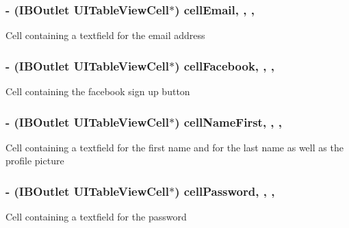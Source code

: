 \subsubsection[{cell\+Email}]{\setlength{\rightskip}{0pt plus 5cm}-\/ (I\+B\+Outlet U\+I\+Table\+View\+Cell$\ast$) cell\+Email\hspace{0.3cm}{\ttfamily [read]}, {\ttfamily [write]}, {\ttfamily [nonatomic]}, {\ttfamily [strong]}}\label{category_e_s_register_view_07_08_ac66f6acb48873fb10a77c519fca9c2d3}
Cell containing a textfield for the email address \hypertarget{category_e_s_register_view_07_08_a4a74d3606bea95c401ecbaba1b12e4b9}{}
\subsubsection[{cell\+Facebook}]{\setlength{\rightskip}{0pt plus 5cm}-\/ (I\+B\+Outlet U\+I\+Table\+View\+Cell$\ast$) cell\+Facebook\hspace{0.3cm}{\ttfamily [read]}, {\ttfamily [write]}, {\ttfamily [nonatomic]}, {\ttfamily [strong]}}\label{category_e_s_register_view_07_08_a4a74d3606bea95c401ecbaba1b12e4b9}
Cell containing the facebook sign up button \hypertarget{category_e_s_register_view_07_08_a5382959659179f1ea52c4ad5773eb7b1}{}
\subsubsection[{cell\+Name\+First}]{\setlength{\rightskip}{0pt plus 5cm}-\/ (I\+B\+Outlet U\+I\+Table\+View\+Cell$\ast$) cell\+Name\+First\hspace{0.3cm}{\ttfamily [read]}, {\ttfamily [write]}, {\ttfamily [nonatomic]}, {\ttfamily [strong]}}\label{category_e_s_register_view_07_08_a5382959659179f1ea52c4ad5773eb7b1}
Cell containing a textfield for the first name and for the last name as well as the profile picture \hypertarget{category_e_s_register_view_07_08_a8a036d69184622c124502ec3ad0b932b}{}
\subsubsection[{cell\+Password}]{\setlength{\rightskip}{0pt plus 5cm}-\/ (I\+B\+Outlet U\+I\+Table\+View\+Cell$\ast$) cell\+Password\hspace{0.3cm}{\ttfamily [read]}, {\ttfamily [write]}, {\ttfamily [nonatomic]}, {\ttfamily [strong]}}\label{category_e_s_register_view_07_08_a8a036d69184622c124502ec3ad0b932b}
Cell containing a textfield for the password \hypertarget{category_e_s_register_view_07_08_a21999c2e9c5d101ced512c64b0e7a560}{}
